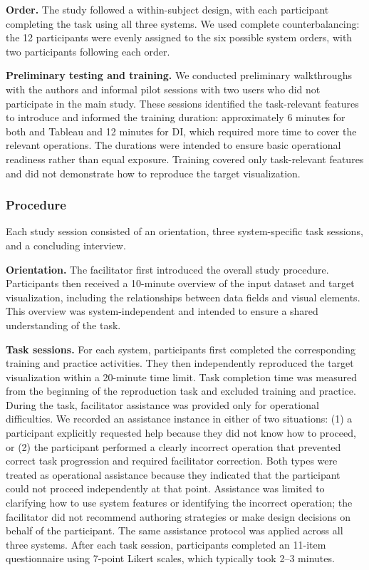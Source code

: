 \textbf{Order.}
The study followed a within-subject design, with each participant completing
the task using all three systems. We
used complete counterbalancing: the 12 participants were evenly assigned to
the six possible system orders, with two participants following each order.

\textbf{Preliminary testing and training.}
We conducted preliminary walkthroughs with the authors and informal pilot
sessions with two users who did not participate in the main study. These
sessions identified the task-relevant features to introduce and informed the
training duration: approximately 6 minutes for both {\system} and Tableau and
12 minutes for DI, which required more time to cover the relevant operations.
The durations were intended to ensure basic operational readiness rather than
equal exposure. Training covered only task-relevant features and did not
demonstrate how to reproduce the target visualization.

\subsubsection{Procedure}

Each study session consisted of an orientation, three system-specific task
sessions, and a concluding interview.

\textbf{Orientation.}
The facilitator first introduced the overall study procedure. Participants
then received a 10-minute overview of the input dataset and target
visualization, including the relationships between data fields and visual
elements. This overview was system-independent and intended to ensure a shared
understanding of the task.

\textbf{Task sessions.}
For each system, participants first completed the corresponding training and
practice activities. They then independently reproduced the target
visualization within a 20-minute time limit. Task completion time was measured
from the beginning of the reproduction task and excluded training and
practice.
During the task, facilitator assistance was provided only for operational
difficulties. We recorded an assistance instance in either of two situations:
(1) a participant explicitly requested help because they did not know how to
proceed, or (2) the participant performed a clearly incorrect operation that
prevented correct task progression and required facilitator correction. Both
types were treated as operational assistance because they indicated that the
participant could not proceed independently at that point. Assistance was
limited to clarifying how to use system features or identifying the incorrect
operation; the facilitator did not recommend authoring strategies or make
design decisions on behalf of the participant. The same assistance protocol
was applied across all three systems.
After each task session, participants completed an 11-item questionnaire using
7-point Likert scales, which typically took 2--3 minutes.

